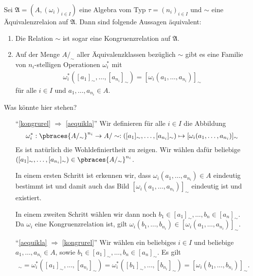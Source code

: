 \begin{exercise}
    Sei $\mathfrak{A} = (A, (\omega_i)_{i \in I})$ eine Algebra vom Typ $\tau = (n_i)_{i \in I}$ und $\sim$ eine Äquivalenzrelaion auf $\mathfrak{A}$. Dann sind folgende Aussagen äquivalent:
    \begin{enumerate}[label = (\roman*)]
        \item \label{kongrurel} Die Relation $\sim$ ist sogar eine Kongruenzrelation auf $\mathfrak{A}$.
        \item \label{aequikla} Auf der Menge $A/_\sim$ aller Äquivalenzklassen bezüglich $\sim$ gibt es eine Familie von $n_i$-stelligen Operationen $\omega_i^*$ mit 
        \begin{align*}
            \omega_i^*([a_1]_\sim, \dots, [a_{n_i}]_\sim) = [\omega_i(a_1, \dots, a_{n_i})]_\sim
        \end{align*}
        für alle $i \in I$ und $a_1, \dots, a_{n_i} \in A$. 
    \end{enumerate}
\end{exercise}

\begin{solution}
    Was könnte hier stehen?
    \begin{enumerate}
        \item[``\ref{kongrurel} $\Rightarrow$ \ref{aequikla}''] Wir definieren für alle $i \in I$ die Abbildung
        \begin{align*}
            \omega_i^*: \pbraces{A/_\sim}^{n_i} \to A/\sim: ([a_1]_\sim, \dots, [a_{n_i}]_\sim) \mapsto [\omega_i(a_1, \dots, a_{n_i})]_\sim
        \end{align*} 
        Es ist natürlich die Wohldefiniertheit zu zeigen. Wir wählen dafür beliebige $([a_1]_\sim, \dots, [a_{n_i}]_\sim) \in \pbraces{A/_\sim}^{n_i}$. 
        
        In einem ersten Schritt ist erkennen wir, dass $\omega_i(a_1, \dots, a_{n_i}) \in A$ eindeutig bestimmt ist und damit auch das Bild $[\omega_i(a_1, \dots, a_{n_i})]_\sim$ eindeutig ist und existiert.
        
        In einem zweiten Schritt wählen wir dann noch $b_1 \in [a_1]_\sim ,\dots, b_n \in [a_n]_\sim$. Da $\omega_i$ eine Kongruenzrelation ist, gilt $\omega_i(b_1, \dots, b_{n_i}) \in [\omega_i(a_1, \dots, a_{n_i})]_\sim$. 

        \item[``\ref{aequikla} $\Rightarrow$ \ref{kongrurel}''] Wir wählen ein beliebiges $i \in I$ und beliebige $a_1, \dots, a_{n_i} \in A$, sowie $b_1 \in [a_1]_\sim ,\dots, b_n \in [a_n]_\sim$. Es gilt
        \begin{align*}
            [\omega_i(a_1, \dots, a_{n_i})]_\sim = \omega_i^*([a_1]_\sim, \dots, [a_{n_i}]_\sim) = \omega_i^*([b_1]_\sim, \dots, [b_{n_i}]_\sim) = [\omega_i(b_1, \dots, b_{n_i})]_\sim.
        \end{align*} 
    \end{enumerate}
\end{solution}